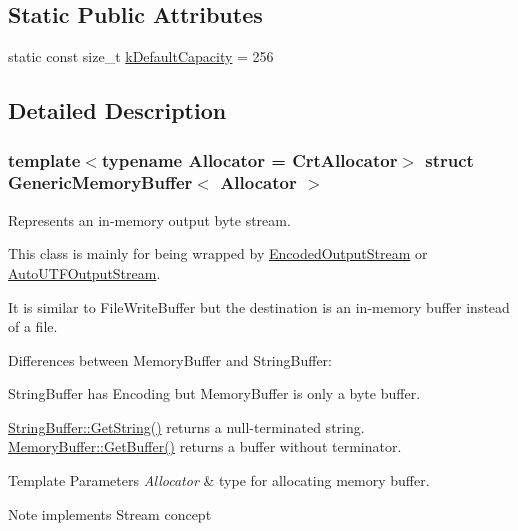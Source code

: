 \subsection*{Static Public Attributes}
\begin{DoxyCompactItemize}
\item 
static const size\+\_\+t \hyperlink{structGenericMemoryBuffer_af6ecdbdbb8d3aa53cdef6e788e4980be}{k\+Default\+Capacity} = 256
\end{DoxyCompactItemize}


\subsection{Detailed Description}
\subsubsection*{template$<$typename Allocator = Crt\+Allocator$>$\newline
struct Generic\+Memory\+Buffer$<$ Allocator $>$}

Represents an in-\/memory output byte stream. 

This class is mainly for being wrapped by \hyperlink{classEncodedOutputStream}{Encoded\+Output\+Stream} or \hyperlink{classAutoUTFOutputStream}{Auto\+U\+T\+F\+Output\+Stream}.

It is similar to File\+Write\+Buffer but the destination is an in-\/memory buffer instead of a file.

Differences between Memory\+Buffer and String\+Buffer\+:
\begin{DoxyEnumerate}
\item String\+Buffer has Encoding but Memory\+Buffer is only a byte buffer.
\item \hyperlink{classGenericStringBuffer_ab06b8c5f1385bd3dfd4caea8b7510f0b}{String\+Buffer\+::\+Get\+String()} returns a null-\/terminated string. \hyperlink{structGenericMemoryBuffer_a8d7be8b1d64285b787571541a7c4bb37}{Memory\+Buffer\+::\+Get\+Buffer()} returns a buffer without terminator.
\end{DoxyEnumerate}


\begin{DoxyTemplParams}{Template Parameters}
{\em Allocator} & type for allocating memory buffer. \\
\hline
\end{DoxyTemplParams}
\begin{DoxyNote}{Note}
implements Stream concept 
\end{DoxyNote}



